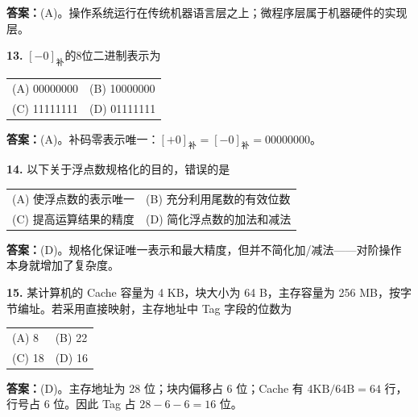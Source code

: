 \ifshowsolutions\par\noindent\textbf{答案：}(A)。操作系统运行在传统机器语言层之上；微程序层属于机器硬件的实现层。\else \answerarea \fi

\vspace{6pt}

\noindent\textbf{13.} $[-0]_{\text{补}}$的8位二进制表示为
\begin{center}
\begin{tabular}{ll}
(A) 00000000 & (B) 10000000 \\[6pt]
(C) 11111111 & (D) 01111111
\end{tabular}
\end{center}

\ifshowsolutions\par\noindent\textbf{答案：}(A)。补码零表示唯一：$[+0]_{\text{补}}=[-0]_{\text{补}}=00000000$。\else \answerarea \fi

\vspace{6pt}

\noindent\textbf{14.} 以下关于浮点数规格化的目的，错误的是
\begin{center}
\begin{tabular}{ll}
(A) 使浮点数的表示唯一 & (B) 充分利用尾数的有效位数 \\[6pt]
(C) 提高运算结果的精度 & (D) 简化浮点数的加法和减法
\end{tabular}
\end{center}

\ifshowsolutions\par\noindent\textbf{答案：}(D)。规格化保证唯一表示和最大精度，但并不简化加/减法——对阶操作本身就增加了复杂度。\else \answerarea \fi

\vspace{6pt}

\noindent\textbf{15.} 某计算机的 Cache 容量为 4 KB，块大小为 64 B，主存容量为 256 MB，按字节编址。若采用直接映射，主存地址中 Tag 字段的位数为
\begin{center}
\begin{tabular}{ll}
(A) 8 & (B) 22 \\[6pt]
(C) 18 & (D) 16
\end{tabular}
\end{center}

\ifshowsolutions\par\noindent\textbf{答案：}(D)。主存地址为 28 位；块内偏移占 6 位；Cache 有 $4\text{KB}/64\text{B}=64$ 行，行号占 6 位。因此 Tag 占 $28-6-6=16$ 位。\else \answerarea \fi

\vspace{6pt}

